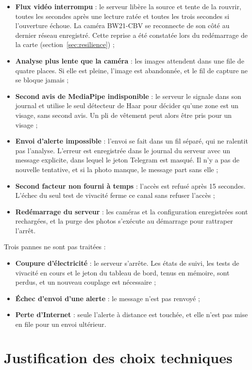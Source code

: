 \begin{itemize}
  \item \textbf{Flux vidéo interrompu} : le serveur libère la source et tente de la rouvrir, toutes les secondes après une lecture ratée et toutes les trois secondes si l'ouverture échoue. La caméra BW21-CBV se reconnecte de son côté au dernier réseau enregistré. Cette reprise a été constatée lors du redémarrage de la carte (section~\ref{sec:resilience}) ;
  \item \textbf{Analyse plus lente que la caméra} : les images attendent dans une file de quatre places. Si elle est pleine, l'image est abandonnée, et le fil de capture ne se bloque jamais ;
  \item \textbf{Second avis de MediaPipe indisponible} : le serveur le signale dans son journal et utilise le seul détecteur de Haar pour décider qu'une zone est un visage, sans second avis. Un pli de vêtement peut alors être pris pour un visage ;
  \item \textbf{Envoi d'alerte impossible} : l'envoi se fait dans un fil séparé, qui ne ralentit pas l'analyse. L'erreur est enregistrée dans le journal du serveur avec un message explicite, dans lequel le jeton Telegram est masqué. Il n'y a pas de nouvelle tentative, et si la photo manque, le message part sans elle ;
  \item \textbf{Second facteur non fourni à temps} : l'accès est refusé après 15 secondes. L'échec du seul test de vivacité ferme ce canal sans refuser l'accès ;
  \item \textbf{Redémarrage du serveur} : les caméras et la configuration enregistrées sont rechargées, et la purge des photos s'exécute au démarrage pour rattraper l'arrêt.
\end{itemize}

Trois pannes ne sont pas traitées :
\begin{itemize}
  \item \textbf{Coupure d'électricité} : le serveur s'arrête. Les états de suivi, les tests de vivacité en cours et le jeton du tableau de bord, tenus en mémoire, sont perdus, et un nouveau couplage est nécessaire ;
  \item \textbf{Échec d'envoi d'une alerte} : le message n'est pas renvoyé ;
  \item \textbf{Perte d'Internet} : seule l'alerte à distance est touchée, et elle n'est pas mise en file pour un envoi ultérieur.
\end{itemize}

\section{Justification des choix techniques}\label{sec:choix}

